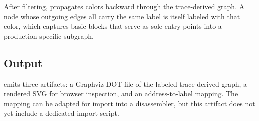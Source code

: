 After filtering, \toolname propagates colors backward through the trace-derived graph.
A node whose outgoing edges all carry the same label is itself labeled with that color, which captures basic blocks that serve as sole entry points into a production-specific subgraph.

\subsection{Output}\label{sec:design:output}

\toolname emits three artifacts: a Graphviz DOT file of the labeled trace-derived graph, a rendered SVG for browser inspection, and an address-to-label mapping.
The mapping can be adapted for import into a disassembler, but this artifact does not yet include a dedicated import script.
